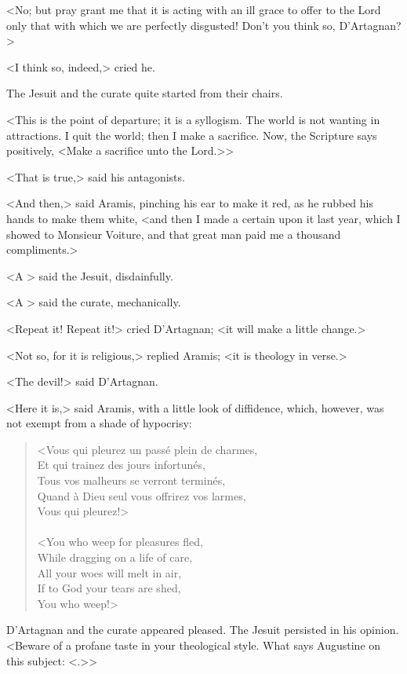 <No; but pray grant me that it is acting with an ill grace to offer to the Lord only that with which we are perfectly disgusted! Don't you think so, D'Artagnan?> 

<I think so, indeed,> cried he. 

The Jesuit and the curate quite started from their chairs. 

<This is the point of departure; it is a syllogism. The world is not wanting in attractions. I quit the world; then I make a sacrifice. Now, the Scripture says positively, <Make a sacrifice unto the Lord.>> 

<That is true,> said his antagonists. 

<And then,> said Aramis, pinching his ear to make it red, as he rubbed his hands to make them white, <and then I made a certain  upon it last year, which I showed to Monsieur Voiture, and that great man paid me a thousand compliments.> 

<A > said the Jesuit, disdainfully. 

<A > said the curate, mechanically. 

<Repeat it! Repeat it!> cried D'Artagnan; <it will make a little change.> 

<Not so, for it is religious,> replied Aramis; <it is theology in verse.> 

<The devil!> said D'Artagnan. 

<Here it is,> said Aramis, with a little look of diffidence, which, however, was not exempt from a shade of hypocrisy: 

\begin{verse}
<Vous qui pleurez un passé plein de charmes,\\
Et qui trainez des jours infortunés,\\
Tous vos malheurs se verront terminés,\\
Quand à Dieu seul vous offrirez vos larmes,\\
Vous qui pleurez!>\\
~\\
<You who weep for pleasures fled,\\
While dragging on a life of care,\\
All your woes will melt in air,\\
If to God your tears are shed,\\
You who weep!>
\end{verse}

D'Artagnan and the curate appeared pleased. The Jesuit persisted in his opinion. <Beware of a profane taste in your theological style. What says Augustine on this subject: <.>> 

